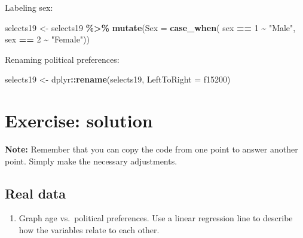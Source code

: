 \documentclass[
]{book}
\newenvironment{Shaded}{\begin{snugshade}}{\end{snugshade}}
\newcommand{\AttributeTok}[1]{\textcolor[rgb]{0.13,0.29,0.53}{#1}}
\newcommand{\DecValTok}[1]{\textcolor[rgb]{0.00,0.00,0.81}{#1}}
\newcommand{\FunctionTok}[1]{\textcolor[rgb]{0.13,0.29,0.53}{\textbf{#1}}}
\newcommand{\NormalTok}[1]{#1}
\newcommand{\OtherTok}[1]{\textcolor[rgb]{0.56,0.35,0.01}{#1}}
\newcommand{\SpecialCharTok}[1]{\textcolor[rgb]{0.81,0.36,0.00}{\textbf{#1}}}
\newcommand{\StringTok}[1]{\textcolor[rgb]{0.31,0.60,0.02}{#1}}
\providecommand{\tightlist}{%
  \setlength{\itemsep}{0pt}\setlength{\parskip}{0pt}}
\begin{document}
Labeling sex:

\begin{Shaded}
\begin{Highlighting}[]
\NormalTok{selects19 }\OtherTok{\textless{}{-}}\NormalTok{ selects19 }\SpecialCharTok{\%\textgreater{}\%}
  \FunctionTok{mutate}\NormalTok{(}\AttributeTok{Sex =} \FunctionTok{case\_when}\NormalTok{(}
\NormalTok{    sex }\SpecialCharTok{==} \DecValTok{1} \SpecialCharTok{\textasciitilde{}} \StringTok{"Male"}\NormalTok{,}
\NormalTok{    sex }\SpecialCharTok{==} \DecValTok{2} \SpecialCharTok{\textasciitilde{}} \StringTok{"Female"}\NormalTok{))}
\end{Highlighting}
\end{Shaded}

Renaming political preferences:

\begin{Shaded}
\begin{Highlighting}[]
\NormalTok{selects19 }\OtherTok{\textless{}{-}}\NormalTok{ dplyr}\SpecialCharTok{::}\FunctionTok{rename}\NormalTok{(selects19, }\AttributeTok{LeftToRight =}\NormalTok{ f15200)}
\end{Highlighting}
\end{Shaded}

\hypertarget{exercise-solution-1}{%
\section{Exercise: solution}\label{exercise-solution-1}}

\textbf{Note:} Remember that you can copy the code from one point to answer another point. Simply make the necessary adjustments.

\hypertarget{real-data-1}{%
\subsection{Real data}\label{real-data-1}}

\begin{enumerate}
\def\labelenumi{\arabic{enumi}.}
\tightlist
\item
  Graph age vs.~political preferences. Use a linear regression line to describe how the variables relate to each other.
\end{enumerate}
\end{document}
